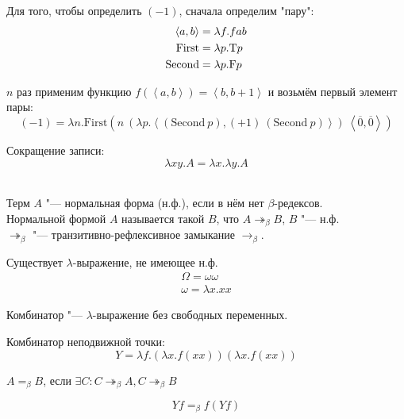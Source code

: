 Для того, чтобы определить $(-1)$, сначала определим "пару":
\begin{alignat*}{2}
    \left<a,b\right> &= \lambda f.f a b \\
    \mathrm{First} &= \lambda p . \mathrm{T} p \\
    \mathrm{Second} &= \lambda p . \mathrm{F} p
\end{alignat*}

$n$ раз применим функцию $f\left(\left<a,b\right>\right) = \left<b,b+1\right>$ и возьмём первый элемент пары:
\[
    (-1) = \lambda n . \mathrm{First} \left(n\ (\lambda p . \left<\left(\mathrm{Second}\ p\right), (+1)\ (\mathrm{Second}\ p)\right>)\
    \left<\overline{0},\overline{0}\right>\right)
\]

Сокращение записи:
\[
    \lambda x y . A = \lambda x . \lambda y . A
\]

\begin{definition} \mbox{} \\
    Терм $A$ "--- нормальная форма (н.ф.), если в нём нет $\beta$-редексов. \\
    Нормальной формой $A$ называется такой $B$, что $A \twoheadrightarrow_{\beta} B$, $B$ "--- н.ф. \\
    $\twoheadrightarrow_{\beta}$ "--- транзитивно-рефлексивное замыкание $\rightarrow_{\beta}$.
\end{definition}

\begin{statement}
    Существует $\lambda$-выражение, не имеющее н.ф.
    \begin{gather*}
        \Omega = \omega \omega \\
        \omega = \lambda x . x x
    \end{gather*}
\end{statement}

\begin{definition}[Комбинатор]
    Комбинатор "--- $\lambda$-выражение без свободных переменных.
\end{definition}

Комбинатор неподвижной точки:
\[
    Y = \lambda f . (\lambda x . f (x x)) (\lambda x . f (x x))
\]

\begin{definition}
    $A=_{\beta}B$, если $\exists C : C \twoheadrightarrow_{\beta} A, C \twoheadrightarrow_{\beta}B$
\end{definition}

\begin{statement}
    \[
        Yf =_{\beta} f(Yf)
    \]
\end{statement}

